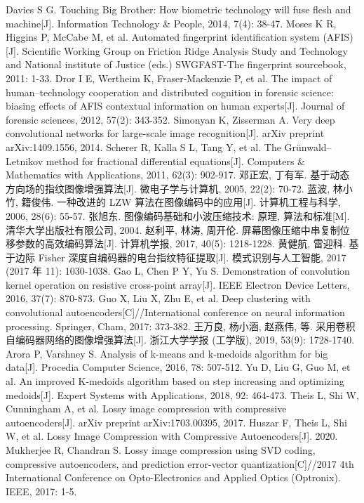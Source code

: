 \documentclass{whutmod}
\begin{document}
    \newpage
    \nocite{*}
    \begin{thebibliography}{9}
         Davies S G. Touching Big Brother: How biometric technology will fuse flesh and machine[J]. Information Technology \& People, 2014, 7(4): 38-47.
         Moses K R, Higgins P, McCabe M, et al. Automated fingerprint identification system (AFIS)[J]. Scientific Working Group on Friction Ridge Analysis Study and Technology and National institute of Justice (eds.) SWGFAST-The fingerprint sourcebook, 2011: 1-33.
         Dror I E, Wertheim K, Fraser‐Mackenzie P, et al. The impact of human–technology cooperation and distributed cognition in forensic science: biasing effects of AFIS contextual information on human experts[J]. Journal of forensic sciences, 2012, 57(2): 343-352.
         Simonyan K, Zisserman A. Very deep convolutional networks for large-scale image recognition[J]. arXiv preprint arXiv:1409.1556, 2014.
         Scherer R, Kalla S L, Tang Y, et al. The Grünwald–Letnikov method for fractional differential equations[J]. Computers \& Mathematics with Applications, 2011, 62(3): 902-917.
         邓正宏, 丁有军. 基于动态方向场的指纹图像增强算法[J]. 微电子学与计算机, 2005, 22(2): 70-72.
         蓝波, 林小竹, 籍俊伟. 一种改进的 LZW 算法在图像编码中的应用[J]. 计算机工程与科学, 2006, 28(6): 55-57.
         张旭东. 图像编码基础和小波压缩技术: 原理, 算法和标准[M]. 清华大学出版社有限公司, 2004.
         赵利平, 林涛, 周开伦. 屏幕图像压缩中串复制位移参数的高效编码算法[J]. 计算机学报, 2017, 40(5): 1218-1228.
         黄健航, 雷迎科. 基于边际 Fisher 深度自编码器的电台指纹特征提取[J]. 模式识别与人工智能, 2017 (2017 年 11): 1030-1038.
         Gao L, Chen P Y, Yu S. Demonstration of convolution kernel operation on resistive cross-point array[J]. IEEE Electron Device Letters, 2016, 37(7): 870-873.
         Guo X, Liu X, Zhu E, et al. Deep clustering with convolutional autoencoders[C]//International conference on neural information processing. Springer, Cham, 2017: 373-382.
         王万良, 杨小涵, 赵燕伟, 等. 采用卷积自编码器网络的图像增强算法[J]. 浙江大学学报 (工学版), 2019, 53(9): 1728-1740.
         Arora P, Varshney S. Analysis of k-means and k-medoids algorithm for big data[J]. Procedia Computer Science, 2016, 78: 507-512.
         Yu D, Liu G, Guo M, et al. An improved K-medoids algorithm based on step increasing and optimizing medoids[J]. Expert Systems with Applications, 2018, 92: 464-473.
         Theis L, Shi W, Cunningham A, et al. Lossy image compression with compressive autoencoders[J]. arXiv preprint arXiv:1703.00395, 2017.
         Huszar F, Theis L, Shi W, et al. Lossy Image Compression with Compressive Autoencoders[J]. 2020.
         Mukherjee R, Chandran S. Lossy image compression using SVD coding, compressive autoencoders, and prediction error-vector quantization[C]//2017 4th International Conference on Opto-Electronics and Applied Optics (Optronix). IEEE, 2017: 1-5.
    \end{thebibliography}
\end{document}
